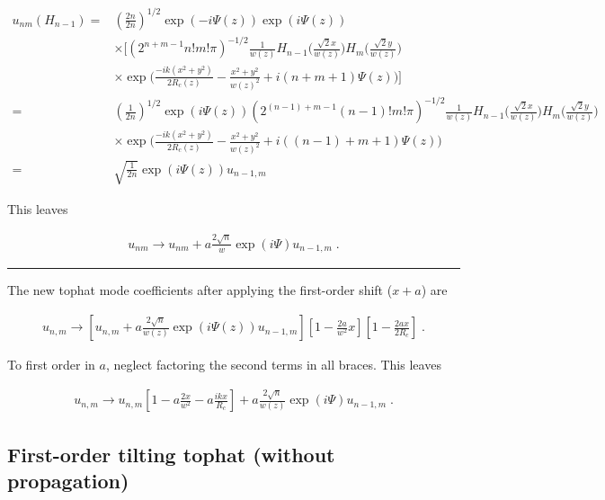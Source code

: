 \documentclass[aps,twoside,secnumarabic,balancelastpage,amsmath,amssymb,nofootinbib,hyperref=pdftex]{revtex4}
\begin{document}
\begin{align*}
	u_{nm} (H_{n-1}) =&
	(\frac{2 n }{2 n})^{1/2}
			\exp(-i \Psi(z))\exp(i \Psi(z))
			\\& \times
	[
	(2^{n+m-1}n!m!\pi)^{-1/2}
		\frac{1}{w(z)}
		H_{n-1} \Big(\frac{\sqrt{2}x}{w(z)} \Big)
		H_{m} \Big(\frac{\sqrt{2}y}{w(z)} \Big)
	\\& \times		
		\exp \Big(\frac{-ik(x^{2}+y^{2})}{2R_{c}(z)}-
		\frac{x^{2}+y^{2}}{w(z)^{2}} 
		+i(n+m+1)\Psi(z)		
		\Big)
				]
		\\=&
		(\frac{1}{2 n}) ^{1/2}
		\exp(i \Psi(z))
			(2^{(n-1)+m-1}(n-1)!m!\pi)^{-1/2}
		\frac{1}{w(z)}
		H_{n-1} \Big(\frac{\sqrt{2}x}{w(z)} \Big)
		H_{m} \Big(\frac{\sqrt{2}y}{w(z)} \Big)
			\\& \times	
		\exp \Big(\frac{-ik(x^{2}+y^{2})}{2R_{c}(z)}-
		\frac{x^{2}+y^{2}}{w(z)^{2}} 
		+i( (n-1)+m+1)\Psi(z)			
		\Big)
		\\=&
		\sqrt{\frac{1}{2 n}}
		\exp(i \Psi(z))
		u_{n-1,m}
\end{align*}

This leaves

\begin{align*}
u_{nm} \rightarrow
u_{nm} + 
	a \frac{2 \sqrt{n}}{w} 
	\exp(i \Psi)
	u_{n-1,m} \; .
\end{align*}

\rule{\textwidth}{0.4pt}

The new tophat mode coefficients after applying the  first-order shift ($x+a$) are 

\begin{align*}
	u_{n,m} \rightarrow
	\left[
     u_{n,m}
    + 
	a \frac{2 \sqrt{n}}{w(z)} 
	\exp(i \Psi(z))
	u_{n-1,m}
	\right]
	 \left[
        1 - \frac{2 a }{w^2} x 
    \right] 
	\left[ 1-\frac{2ax}{2R_c}
	\right]    
    \; .
\end{align*}

To first order in $a$, neglect factoring the second terms in all braces. This leaves

\begin{align*}
	u_{n,m} \rightarrow
     u_{n,m}
     	 \left[
        1 - a\frac{2 x}{w^2}  
        - a \frac{ikx}{R_c}
    \right]
    + 
	a \frac{2 \sqrt{n}}{w(z)} 
	\exp(i \Psi)
	u_{n-1,m} \; .
\end{align*}

\subsection{First-order tilting tophat (without propagation)}
\end{document}
